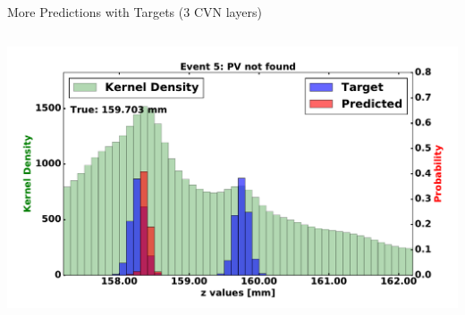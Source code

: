 \begin{frame}{More Predictions with Targets (3 CVN layers)}
\begin{columns}[c]
\begin{center}
           \includegraphics[width=1\textwidth, height=0.45\textwidth, trim=18 0 18 0]{images/120000_3layer_35.pdf}
       \end{center}
  \end{columns}
\end{frame}

